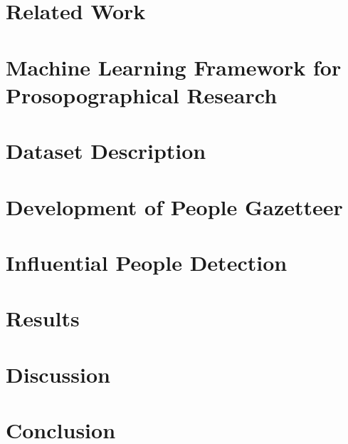 \documentclass[10pt,journal,compsoc]{IEEEtran}
\begin{document}
\section{Related Work}
\label{influential:rw}


\section{Machine Learning Framework for Prosopographical Research}


\section{Dataset Description}




\section{Development of People Gazetteer}
\label{chapter:people gazetteer}




\section{Influential People Detection}
\label{influential}




\section{Results}
\label{influential:results}




\section{Discussion}
\label{influential:discussion}




\section{Conclusion}



\end{document}
